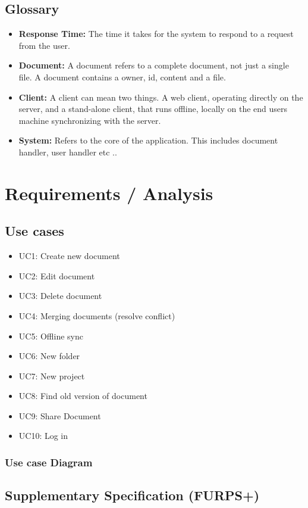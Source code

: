 \documentclass[11pt]{article}
\begin{document}
\subsection{Glossary}
\label{sec-1-2}

\begin{itemize}
\item \textbf{Response Time:} The time it takes for the system to respond to a request from the user.
\item \textbf{Document:} A document refers to a complete document, not just a single file. A document contains a owner, id, content and a file.
\item \textbf{Client:} A client can mean two things. A web client, operating directly on the server, and a stand-alone client, that runs offline, 
     locally on the end users machine synchronizing with the server.
\item \textbf{System:} Refers to the core of the application. This includes document handler, user handler etc ..
\end{itemize}
\section{Requirements / Analysis}
\label{sec-2}
\subsection{Use cases}
\label{sec-2-1}

\begin{itemize}
\item UC1: Create new document
\item UC2: Edit document
\item UC3: Delete document
\item UC4: Merging documents (resolve conflict)
\item UC5: Offline sync
\item UC6: New folder
\item UC7: New project
\item UC8: Find old version of document
\item UC9: Share Document
\item UC10: Log in
\end{itemize}
\subsubsection{Use case Diagram}
\label{sec-2-1-1}
\subsection{Supplementary Specification (FURPS+)}
\label{sec-2-2}
\end{document}

